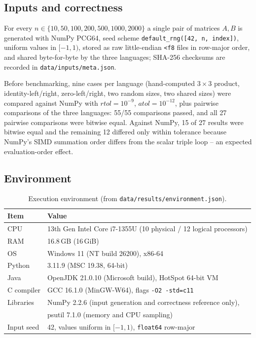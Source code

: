 \documentclass[11pt,a4paper]{article}
\begin{document}
\subsection{Inputs and correctness}

For every $n \in \{10,50,100,200,500,1000,2000\}$ a single pair of matrices $A,B$
is generated with NumPy PCG64, seed scheme \texttt{default\_rng([42, n, index])},
uniform values in $[-1,1)$, stored as raw little-endian \texttt{<f8} files in
row-major order, and shared byte-for-byte by the three languages; SHA-256 checksums
are recorded in \texttt{data/inputs/meta.json}.

Before benchmarking, nine cases per language (hand-computed $3\times3$ product,
identity-left/right, zero-left/right, two random sizes, two shared sizes) were
compared against NumPy with $rtol=10^{-9}$, $atol=10^{-12}$, plus pairwise
comparisons of the three languages: 55/55 comparisons passed, and all 27 pairwise
comparisons were bitwise equal. Against NumPy, 15 of 27 results were bitwise equal
and the remaining 12 differed only within tolerance because NumPy's SIMD summation
order differs from the scalar triple loop -- an expected evaluation-order effect.

\subsection{Environment}

\begin{table}[htbp]
\centering
\caption{Execution environment (from \texttt{data/results/environment.json}).}
\label{tab:env}
\begin{tabular}{@{}ll@{}}
\toprule
Item & Value \\
\midrule
CPU & 13th Gen Intel Core i7-1355U (10 physical / 12 logical processors) \\
RAM & 16.8\,GB (16\,GiB) \\
OS & Windows 11 (NT build 26200), x86-64 \\
Python & 3.11.9 (MSC 19.38, 64-bit) \\
Java & OpenJDK 21.0.10 (Microsoft build), HotSpot 64-bit VM \\
C compiler & GCC 16.1.0 (MinGW-W64), flags \texttt{-O2 -std=c11} \\
Libraries & NumPy 2.2.6 (input generation and correctness reference only), \\
           & psutil 7.1.0 (memory and CPU sampling) \\
Input seed & 42, values uniform in $[-1,1)$, \texttt{float64} row-major \\
\bottomrule
\end{tabular}
\end{table}
\end{document}
